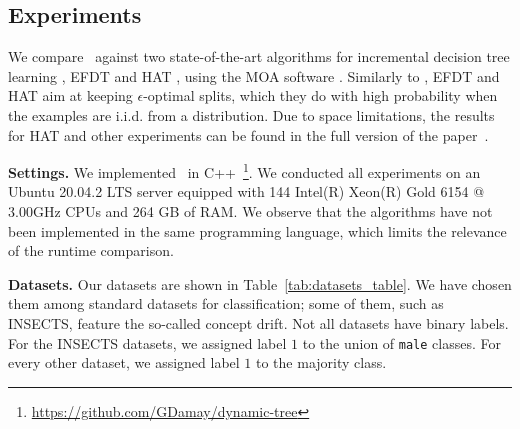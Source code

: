 \subsection{Experiments}
We compare \algo\ against two state-of-the-art algorithms for incremental decision tree learning %
, EFDT \cite{Manapragada2018_EFDT} and HAT \cite{bifet2009_AdaptiveLearning}, using the MOA software \cite{Bifet2010_MOA}. Similarly to \algo, EFDT and HAT aim at keeping $\epsilon$-optimal splits, which they do with high probability when the examples are i.i.d. from a distribution.
Due to space limitations, the results for HAT and other experiments can be found in the full version of the paper~\cite{BDS22arxiv}.  

\noindent\textbf{Settings.} We implemented \algo\ in C++~\footnote{\url{https://github.com/GDamay/dynamic-tree}}. We conducted all experiments on an Ubuntu 20.04.2 LTS server equipped with 144 Intel(R) Xeon(R) Gold 6154 @ 3.00GHz CPUs and 264 GB of RAM. We observe that the algorithms have not been implemented in the same programming language, which limits the relevance of the runtime comparison.

\noindent\textbf{Datasets.} Our datasets are shown in Table~\ref{tab:datasets_table}. We have chosen them among standard datasets for classification; some of them, such as INSECTS, feature the so-called concept drift. Not all datasets have binary labels. For the INSECTS datasets, we assigned label $1$ to  the union of \texttt{male} classes. For every other dataset, we assigned label $1$ to the majority class. %


